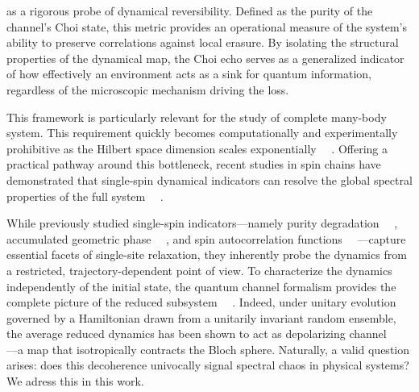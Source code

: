 \documentclass[pra,twocolumn,aps,showpacs,superscriptaddress,longbibliography]{revtex4-2}%
\providecommand{\DIFadd}[1]{{\protect\color{blue} \sf #1}} %
\providecommand{\DIFdel}[1]{{\protect\color{red} \scriptsize #1}} %
\providecommand{\DIFaddbegin}{} %
\providecommand{\DIFdelend}{} %
\begin{document}
\DIFdel{as a rigorous probe of dynamical reversibility. Defined as the purity of the channel's Choi state, this metric provides an operational measure of the system's ability to preserve correlations against local erasure. By isolating the structural properties of the dynamical map, the Choi echo serves as a generalized indicator of how effectively an environment acts as a sink for quantum information, regardless of the microscopic mechanism driving the loss. }%

\DIFdel{This framework is particularly relevant for the study of }\DIFdelend \DIFaddbegin \DIFadd{complete many-body system. This requirement quickly becomes computationally and experimentally prohibitive as the Hilbert space dimension scales exponentially~\mbox{%
\cite{roushan2017spectroscopic, dong_2025_measuring}}\hskip0pt%
.
Offering a practical pathway around this bottleneck, recent studies in spin chains have demonstrated that single-spin dynamical indicators can resolve the global spectral properties of the full system~\mbox{%
\cite{mirkin_2021_quantum, mirkin_2021_sensing, vallejo-fabila_2025_singlesite}}\hskip0pt%
.
}

\DIFadd{While previously studied single-spin indicators---namely purity degradation~\mbox{%
\cite{mirkin_2021_quantum}}\hskip0pt%
, accumulated geometric phase~\mbox{%
\cite{mirkin_2021_sensing}}\hskip0pt%
, and spin autocorrelation functions~\mbox{%
\cite{vallejo-fabila_2025_singlesite}}\hskip0pt%
---capture essential facets of single-site relaxation, they inherently probe the dynamics from a restricted, trajectory-dependent point of view. To characterize the dynamics independently of the initial state, the quantum channel formalism provides the complete picture of the reduced subsystem~\mbox{%
\cite{breuer_2002_theory,nielsen_2010_quantum,bengtsson_2006_geometry}}\hskip0pt%
. Indeed, under unitary evolution governed by a Hamiltonian drawn from a unitarily invariant random ensemble, the average reduced dynamics has been shown to act as depolarizing channel~\mbox{%
\cite{znidaric_2011_nonmarkovian}}\hskip0pt%
---a map that isotropically contracts the Bloch sphere. Naturally, a valid question arises: does this decoherence univocally signal spectral chaos in physical systems? We adress this in this work.  
}
\end{document}
